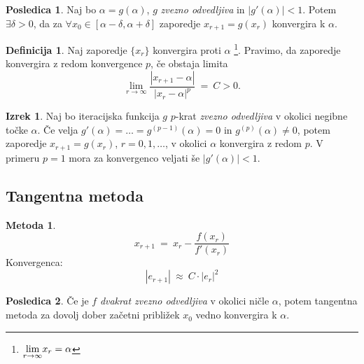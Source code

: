 \documentclass[11pt]{article}
\theoremstyle{definition}
\newtheorem{definicija}{Definicija}[section]
\newtheorem{izrek}{Izrek}
\newtheorem*{posledica}{Posledica}
\newtheorem*{metoda}{Metoda}
\begin{document}
\begin{posledica}

Naj bo $\alpha = g(\alpha)$, $g$ \textit{zvezno odvedljiva} in $|g'(\alpha)| < 1$. Potem $\exists \delta > 0$, da za $\forall x_0 \in [\alpha - \delta, \alpha + \delta]$ zaporedje $x_{r+1} = g(x_r)$ konvergira k $\alpha$.

\end{posledica}
\vspace{0.5cm}

\begin{definicija}

Naj zaporedje $\{ x_r \}$ konvergira proti $\alpha$ \footnote{$\mathlarger{\lim_{r \rightarrow \infty}} x_r = \alpha$}. Pravimo, da zaporedje konvergira z redom konvergence $p$, če obstaja limita
$$\lim_{r \rightarrow \infty} \frac{|x_{r+1} - \alpha|}{|x_r - \alpha|^p} ~=~ C > 0.$$

\end{definicija}
\vspace{0.5cm}

\begin{izrek}

Naj bo iteracijska funkcija $g$ $p$-krat \textit{zvezno odvedljiva} v okolici negibne točke $\alpha$. Če velja $g'(\alpha) = \ldots = g^{(p-1)}(\alpha) = 0$ in $g^{(p)}(\alpha) \neq 0$, potem zaporedje $x_{r+1} = g(x_r)$, $r = 0, 1, \ldots$, v okolici $\alpha$ konvergira z redom $p$. V primeru $p = 1$ mora za konvergenco veljati še $|g'(\alpha)| < 1$. 

\end{izrek}
\vspace{0.5cm}


\subsection{Tangentna metoda}
\vspace{0.5cm}

\begin{metoda}

$$x_{r+1} ~=~ x_r - \frac{f(x_r)}{f'(x_r)}$$
Konvergenca:
$$|e_{r+1}| ~\approx~ C \cdot |e_r|^2$$

\end{metoda}
\vspace{0.5cm}

\begin{posledica}

Če je $f$ \textit{dvakrat zvezno odvedljiva} v okolici ničle $\alpha$, potem tangentna metoda za dovolj dober začetni približek $x_0$ vedno konvergira k $\alpha$.

\end{posledica}
\vspace{0.5cm}
\end{document}
